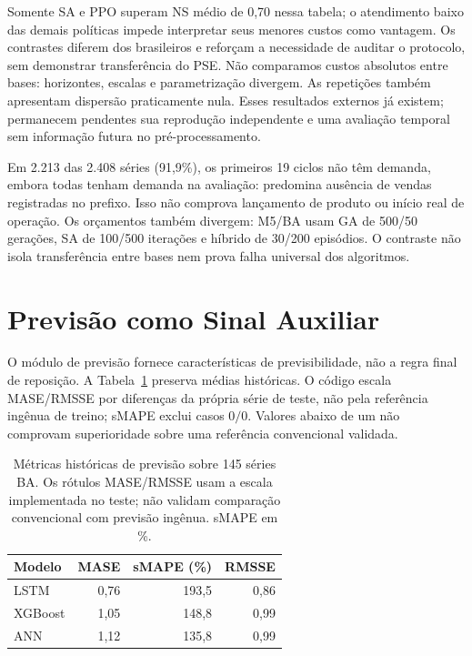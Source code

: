 Somente SA e PPO superam NS médio de 0,70 nessa tabela; o atendimento baixo das demais políticas impede interpretar seus menores custos como vantagem. Os contrastes diferem dos brasileiros e reforçam a necessidade de auditar o protocolo, sem demonstrar transferência do PSE. Não comparamos custos absolutos entre bases: horizontes, escalas e parametrização divergem. As repetições também apresentam dispersão praticamente nula. Esses resultados externos já existem; permanecem pendentes sua reprodução independente e uma avaliação temporal sem informação futura no pré-processamento.

Em 2.213 das 2.408 séries (91,9\%), os primeiros 19 ciclos não têm demanda, embora todas tenham demanda na avaliação: predomina ausência de vendas registradas no prefixo. Isso não comprova lançamento de produto ou início real de operação. Os orçamentos também divergem: M5/BA usam GA de 500/50 gerações, SA de 100/500 iterações e híbrido de 30/200 episódios. O contraste não isola transferência entre bases nem prova falha universal dos algoritmos.



\section{Previsão como Sinal Auxiliar}

O módulo de previsão fornece características de previsibilidade, não a regra final de reposição. A Tabela~\ref{tab:forecast_metrics} preserva médias históricas. O código escala MASE/RMSSE por diferenças da própria série de teste, não pela referência ingênua de treino; sMAPE exclui casos $0/0$. Valores abaixo de um não comprovam superioridade sobre uma referência convencional validada.

\begin{table}[ht]
\centering
\small
\caption{Métricas históricas de previsão sobre 145 séries BA. Os rótulos MASE/RMSSE usam a escala implementada no teste; não validam comparação convencional com previsão ingênua. sMAPE em \%.}
\label{tab:forecast_metrics}
\begin{tabular}{@{}lrrr@{}}
\toprule
Modelo   & MASE & sMAPE (\%) & RMSSE \\
\midrule
LSTM     & 0,76 & 193,5 & 0,86 \\
XGBoost  & 1,05 & 148,8 & 0,99 \\
ANN      & 1,12 & 135,8 & 0,99 \\
\bottomrule
\end{tabular}
\end{table}

